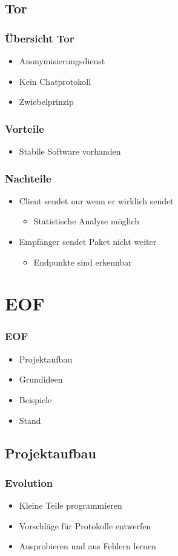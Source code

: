 \documentclass{beamer}
\begin{document}
\subsection{Tor}
\frame
{
  \frametitle{\"Ubersicht Tor}

  \begin{itemize}
  \item Anonymisierungsdienst
  \pause
  \item Kein Chatprotokoll
  \pause
  \item Zwiebelprinzip
  \end{itemize}
}

\frame
{
  \frametitle{Vorteile}

  \begin{itemize}
  \item Stabile Software vorhanden
  \end{itemize}
}

\frame
{
  \frametitle{Nachteile}

  \begin{itemize}
  \item Client sendet nur wenn er wirklich sendet
  \pause
  \begin{itemize}
  \item Statistische Analyse m\"oglich
  \pause
  \end{itemize}
  \item Empf\"anger sendet Paket nicht weiter
  \pause
  \begin{itemize}
  \item Endpunkte sind erkennbar
  \end{itemize}
  \end{itemize}
}


\section{EOF}
\frame
{
  \frametitle{EOF}

  \begin{itemize}
  \item Projektaufbau
  \pause
  \item Grundideen
  \pause
  \item Beispiele
  \pause
  \item Stand
  \end{itemize}
}

\subsection{Projektaufbau}
\frame
{
  \frametitle{Evolution}

  \begin{itemize}
  \item Kleine Teile programmieren
  \pause
  \item Vorschl\"age f\"ur Protokolle entwerfen
  \pause
  \item Ausprobieren und aus Fehlern lernen
  \end{itemize}
}
\end{document}
